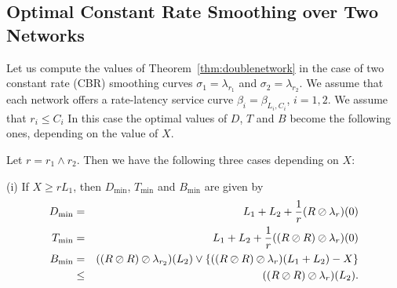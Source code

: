 \subsection{Optimal Constant Rate Smoothing over Two Networks}

Let us compute the values of Theorem~\ref{thm:doublenetwork} in the case of two constant rate (CBR) smoothing curves $\sigma_1 = \lambda_{r_1}$
and $\sigma_2 =  \lambda_{r_2}$. We assume that each network offers a rate-latency service curve $\beta_i = \beta_{L_i,C_i} $, $i = 1,2$. We assume that $r_i \leq C_i$
%
In this case the optimal values of $D$, $T$ and $B$
become the following ones, depending on the value of $X$.

\begin{theorem}
Let $r = r_1 \wedge r_2$. Then we have the following three cases depending on $X$:

\noindent
(i) If $X \geq rL_1$, then $D_{\min}$, $T_{\min}$ and $B_{\min}$ are given by
\begin{eqnarray}
 \mylabel{eq:optimalplaybackdelayCBRtwonetworks}
D_{\min} & = & L_1 + L_2 + \frac{1}{r} (R \oslash \lambda_{r})(0) \\
\mylabel{eq:optimaltotaldelayCBRtwonetworks}
T_{\min} & = & L_1 + L_2 + \frac{1}{r} ((R \oslash R)  \oslash \lambda_{r})(0) \\
\mylabel{eq:optimalplaybackbufferCBRtwonetworks}
B_{\min} & = & ((R \oslash R) \oslash \lambda_{r_2})(L_2) \vee \{ ((R \oslash R) \oslash \lambda_{r})(L_1 + L_2) - X \} \nonumber \\
    & \leq & ((R \oslash R) \oslash \lambda_{r})(L_2).
\end{eqnarray}


\end{theorem}
